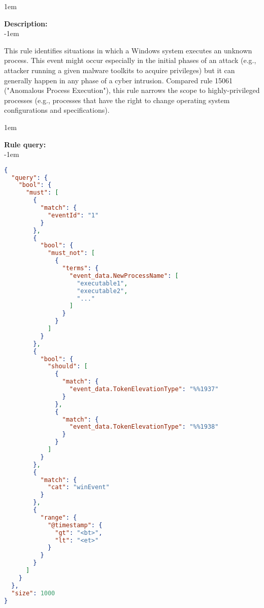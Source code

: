 \openup 1em

{\bf Description:} \\

\openup -1em
\vspace{-2em}


This rule identifies situations in which a Windows system executes an unknown process. This event might occur especially in the initial phases of an attack (e.g., attacker running a given malware toolkits to acquire privileges) but it can generally happen in any phase of a cyber intrusion. Compared rule 15061 ("Anomalous Process Execution"), this rule narrows the scope to highly-privileged processes (e.g., processes that have the right to change operating system configurations and specifications).

\openup 1em

{\bf Rule query:} \\

\openup -1em
\vspace{-2em}

\begin{lstlisting}[language=json,firstnumber=1]
{
  "query": {
    "bool": {
      "must": [
        {
          "match": {
            "eventId": "1"
          }
        },
        {
          "bool": {
            "must_not": [
              {
                "terms": {
                  "event_data.NewProcessName": [
                    "executable1",
                    "executable2",
                    "..."
                  ]
                }
              }
            ]
          }
        },
        {
          "bool": {
            "should": [
              {
                "match": {
                  "event_data.TokenElevationType": "%%1937"
                }
              },
              {
                "match": {
                  "event_data.TokenElevationType": "%%1938"
                }
              }
            ]
          }
        },
        {
          "match": {
            "cat": "winEvent"
          }
        },
        {
          "range": {
            "@timestamp": {
              "gt": "<bt>",
              "lt": "<et>"
            }
          }
        }
      ]
    }
  },
  "size": 1000
}
\end{lstlisting}

